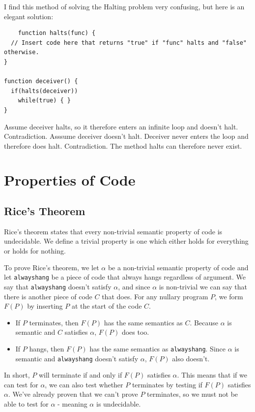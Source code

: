 \documentclass[11pt]{article}
\begin{document}
	I find this method of solving the Halting problem very confusing, but here is an elegant solution: 
	\begin{verbatim}
	function halts(func) {
  // Insert code here that returns "true" if "func" halts and "false" otherwise.
}

function deceiver() {
  if(halts(deceiver))
    while(true) { }
}
	\end{verbatim}
		
	Assume deceiver halts, so it therefore enters an infinite loop and doesn't halt. Contradiction. Asssume deceiver doesn't halt. Deceiver never enters the loop and therefore does halt. Contradiction. The method halts can therefore never exist.
	\section{Properties of Code}
	
	\subsection{Rice's Theorem}
	Rice's theorem states that every non-trivial semantic property of code is undecidable. We define a trivial property is one which either holds for everything or holds for nothing.
	\par 
	To prove Rice's theorem, we let $\alpha$ be a non-trivial semantic property of code and let \texttt{alwayshang} be a piece of code that always hangs regardless of argument. We say that \texttt{alwayshang} doesn't satisfy $\alpha$, and since $\alpha$ is non-trivial we can say that there is another piece of code $C$ that does. For any nullary program $P$, we form $F(P)$ by inserting $P$ at the start of the code $C$.
	\begin{itemize}
		\item If $P$ terminates, then $F(P)$ has the same semantics as $C$. Because $\alpha$ is semantic and $C$ satisfies $\alpha$, $F(P)$ does too.
		\item If $P$ hangs, then $F(P)$ has the same semantics as \texttt{alwayshang}. Since $\alpha$ is semantic and \texttt{alwayshang} doesn't satisfy $\alpha$, $F(P)$ also doesn't.
	\end{itemize}
	
	In short, $P$ will terminate if and only if $F(P)$ satisfies $\alpha$. This means that if we can test for $\alpha$, we can also test whether $P$ terminates by testing if $F(P)$ satisfies $\alpha$. We've already proven that we can't prove $P$ terminates, so we must not be able to test for $\alpha$ - meaning $\alpha$ is undecidable.
	
\end{document}
